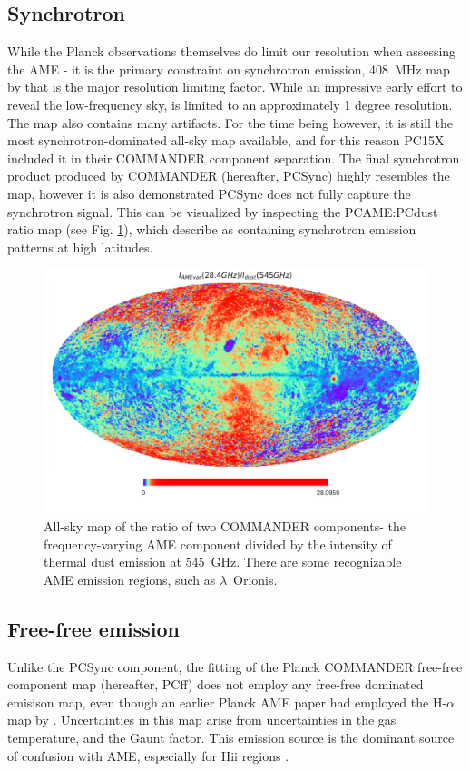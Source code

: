        \subsection{Synchrotron}
        While the Planck observations themselves do limit our resolution when assessing the AME - it is the primary constraint on synchrotron emission, 408~MHz map by \cite{haslam82} that is the major resolution limiting factor. While an impressive early effort to reveal the low-frequency sky, \citep{haslam82} is limited to an approximately 1 degree resolution. The map also contains
        many artifacts. For the time being however, it is still the most synchrotron-dominated all-sky map available, and for this reason PC15X included it in their COMMANDER component separation. The final synchrotron product produced by COMMANDER (hereafter, PCSync) highly resembles the \citep{haslam82} map, however it is also demonstrated PCSync does not fully capture the synchrotron signal. This can be visualized by inspecting the PCAME:PCdust ratio map (see Fig. \ref{fig:R_PCAMEtoPCdust}), which \cite{hensley16} describe as containing synchrotron emission patterns at high latitudes.

        \begin{figure}
            \centering
            \includegraphics[width=\textwidth]{../Plots/ch_datasources/R_PCAMEtoPCRad.pdf}
            \caption{All-sky map of the ratio of two COMMANDER components- the frequency-varying AME component divided by the intensity of thermal dust emission at 545~GHz. There are some recognizable AME emission regions, such as $\lambda$~Orionis. }
            \label{fig:R_PCAMEtoPCdust}
        \end{figure}

       \subsection{Free-free emission}
        Unlike the PCSync component, the fitting of the Planck COMMANDER free-free component map (hereafter, PCff) does not employ any free-free dominated emisison map, even though an earlier Planck AME paper \citep{planckXV} had employed the H-$\alpha$ map by \cite{wham98}. Uncertainties in this map arise from uncertainties in the gas temperature, and the Gaunt factor. This emission source is the dominant source of confusion with AME, especially for Hii regions \citep{planckXV,planckXII, paladini15}.

